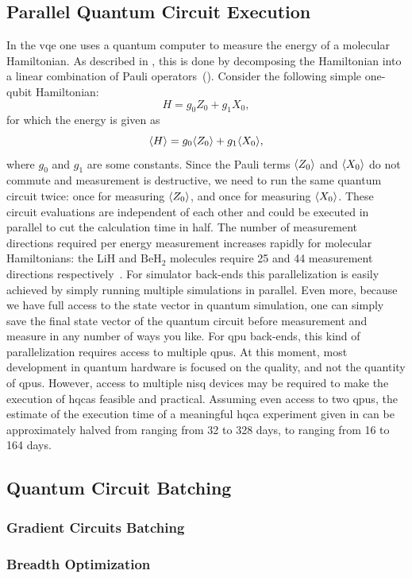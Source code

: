 \subsection{Parallel Quantum Circuit Execution}
In the \gls{vqe} one uses a quantum computer to measure the energy of a molecular Hamiltonian.
As described in , this is done by decomposing the Hamiltonian into a linear combination of Pauli operators~().
Consider the following simple one-qubit Hamiltonian:
\begin{equation}
H = g_0Z_0 + g_1X_0,
\end{equation}
for which the energy is given as
\begin{equation}
\langle{H}\rangle = g_0\langle{Z_0}\rangle + g_1\langle{X_0}\rangle,
\end{equation}
where $g_0$ and $g_1$ are some constants.
Since the Pauli terms $\langle{Z_0}\rangle$ and $\langle{X_0}\rangle$ do not commute and measurement is destructive, we need to run the same quantum circuit twice: once for measuring $\langle{Z_0}\rangle$, and once for measuring $\langle{X_0}\rangle$.
These circuit evaluations are independent of each other and could be executed in parallel to cut the calculation time in half.
The number of measurement directions required per energy measurement increases rapidly for molecular Hamiltonians: the LiH and $\ensuremath{\mathrm{BeH_2}}$ molecules require 25 and 44 measurement directions respectively~\cite[Supplementary Information, Section III]{kandala2017hardware}.
For simulator back-ends this parallelization is easily achieved by simply running multiple simulations in parallel.
Even more, because we have full access to the state vector in quantum simulation, one can simply save the final state vector of the quantum circuit before measurement and measure in any number of ways you like.
For \gls{qpu} back-ends, this kind of parallelization requires access to multiple \glspl{qpu}.
At this moment, most development in quantum hardware is focused on the quality, and not the quantity of \glspl{qpu}.
However, access to multiple \gls{nisq} devices may be required to make the execution of \glspl{hqca} feasible and practical.
Assuming even access to two \glspl{qpu}, the estimate of the execution time of a meaningful \gls{hqca} experiment given in  can be approximately halved from ranging from 32 to 328 days, to ranging from 16 to 164 days.

\subsection{Quantum Circuit Batching}
\subsubsection{Gradient Circuits Batching}
\subsubsection{Breadth Optimization}